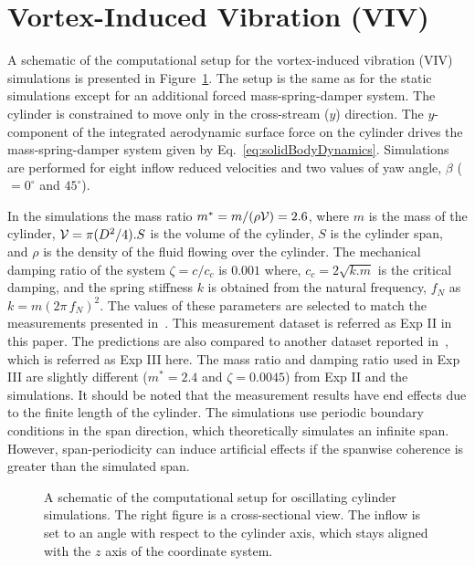 \section{Vortex-Induced Vibration (VIV)}
\label{sec:VIV}
%
A schematic of the computational setup for the vortex-induced vibration (VIV)
simulations is presented in Figure~\ref{fig:VIVmodel}. The setup is the same as
for the static simulations except for an additional forced mass-spring-damper
system. The cylinder is constrained to move only in the cross-stream ($y$)
direction. The $y$-component of the integrated aerodynamic surface force on the
cylinder drives the mass-spring-damper system given by
Eq.~\ref{eq:solidBodyDynamics}. Simulations are performed for eight inflow
reduced velocities and two values of yaw angle, $\beta$ ($=0^\circ$ and
$45^\circ$).
 
In the simulations the mass ratio $m^*=m/(\rho {\cal V})=2.6$, where $m$ is the
mass of the cylinder, ${\cal V}=\pi (D^2/4) . S$ is the volume of the cylinder,
$S$ is the cylinder span, and $\rho$ is the density of the fluid flowing over
the cylinder. The mechanical damping ratio of the system $\zeta = c/c_c$ is
$0.001$ where, $c_c=2\sqrt{k.m}$ is the critical damping, and the spring
stiffness $k$ is obtained from the natural frequency, $f_N$ as
$k=m(2\pi\,f_N)^2$. The values of these parameters are selected to match the
measurements presented in~\cite{franzini2013one}. This measurement dataset is
referred as Exp II in this paper. The predictions are also compared to another
dataset reported in~\cite{khalak1997fluid}, which is referred as Exp III here.
The mass ratio and damping ratio used in Exp III are slightly different
($m^*=2.4$ and $\zeta=0.0045$) from Exp II and the simulations. It should be
noted that the measurement results have end effects due to the finite length of
the cylinder. The simulations use periodic boundary conditions in the span
direction, which theoretically simulates an infinite span. However,
span-periodicity can induce artificial effects if the spanwise coherence is
greater than the simulated span.
%
\begin{figure}[htb!]
  \caption{A schematic of the computational setup for oscillating cylinder
    simulations. The right figure is a cross-sectional view.  The inflow is set
    to an angle with respect to the cylinder axis, which stays aligned with the $z$
    axis of the coordinate system.}
  \label{fig:VIVmodel}
\end{figure}


